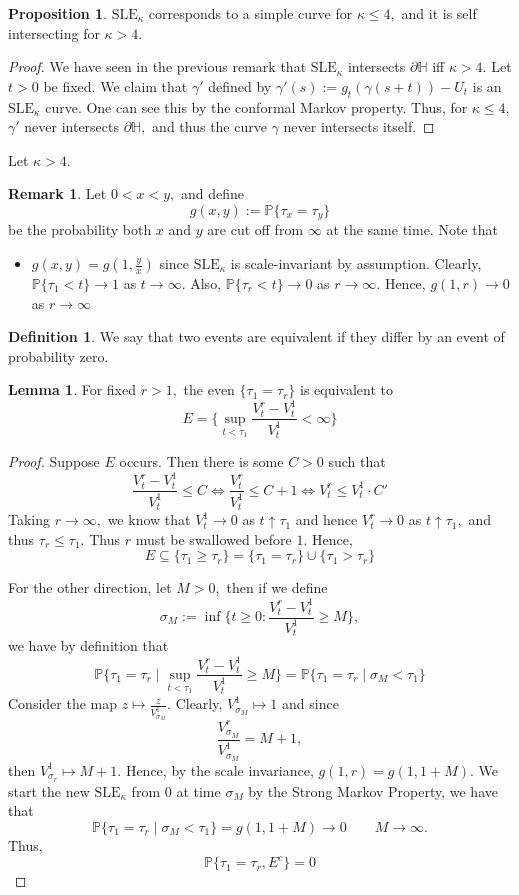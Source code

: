 \documentclass[10pt, oneside]{article}
\newcommand{\bbP}{\mathbb{P}}
\theoremstyle{definition}
\newtheorem{defn}{Definition}
\newtheorem{prop}{Proposition}
\newtheorem{rem}{Remark}
\newtheorem{lem}{Lemma}
\newcommand{\bbH}{\mathbb{H}}
\newcommand{\bbP}{\mathbb{P}}
\newcommand{\SLE}{\text{SLE}}
\begin{document}
\begin{prop}
    $\SLE_\kappa$ corresponds to a simple curve for $\kappa \leq 4,$ and it is self intersecting for $\kappa >4.$ 
\end{prop}
\begin{proof}
    We have seen in the previous remark that $\SLE_\kappa$  intersects $\partial \bbH$ iff $\kappa>4.$ Let $t>0$ be fixed. We claim that $\gamma'$ defined by $\gamma'(s):= g_t(\gamma(s + t)) - U_t$ is an $\SLE_\kappa$ curve. One can see this by the conformal Markov property. Thus, for $\kappa \leq 4,$ $\gamma'$ never intersects $\partial \bbH,$ and thus the curve $\gamma$ never intersects itself.
\end{proof}

Let $\kappa >4.$
\begin{rem}
    Let $0 < x < y,$ and define 
    \[g(x,y):= \bbP\{\tau_x = \tau_y\}\] be the probability both $x$ and $y$ are cut off from $\infty$ at the same time. Note that 
    \begin{itemize}
        \item $g(x,y) = g(1, \frac{y}{x})$ since $\SLE_\kappa$ is scale-invariant by assumption. Clearly, $\bbP\{\tau_1 < t\} \to 1$ as $t \to \infty. $ Also, $\bbP\{\tau_r < t\} \to 0$ as $r\to \infty.$ Hence, $g(1,r) \to 0$ as $r\to \infty$
    \end{itemize}
\end{rem}
\begin{defn}
    We say that two events are equivalent if they differ by an event of probability zero.
\end{defn}

\begin{lem}
    For fixed $r>1,$ the even $\{\tau_1 = \tau_r\}$ is equivalent to 
    \[E = \{\sup_{t< \tau_1} \frac{V_t^r - V_t^1}{V_t^1} < \infty\}\]
\end{lem}
\begin{proof}
    Suppose $E$ occurs. Then there is some $C>0$ such that 
    \[\frac{V_t^r- V_t^1}{V_t^1} \leq C \iff \frac{V_t^r}{V_t^1} \leq C + 1  \iff V_t^r \leq V_t^1 \cdot C'\] Taking $r\to \infty,$ we know that $V_t^1 \to 0$ as $t\uparrow \tau_1$ and hence $V_t^r \to 0$ as $t \uparrow \tau_1,$ and thus $\tau_r \leq \tau_1.$ Thus $r$ must be swallowed before $1.$ Hence, 
    \[E \subseteq \{\tau_1 \geq \tau_r\} = \{\tau_1 = \tau_r\}\cup \{\tau_1 > \tau _r\}\]

    For the other direction, let $M>0,$ then if we define 
    \[\sigma_M:= \inf\{t \geq 0 : \frac{V_t^r - V_t^1}{V_t^1} \geq M\},\] we have by definition that
    \[\bbP\{\tau_1 = \tau_r \mid \sup_{t <  \tau_1}\frac{V_t^r - V_t^1}{V_t^1}\geq M\}= \bbP\{\tau_1 = \tau_r \mid \sigma_M < \tau_1\}\] Consider the map $z \mapsto \frac{z}{V^1_{\sigma_M}}$. Clearly, $V_{\sigma_M}^1 \mapsto 1$ and since 
    \[\frac{V^r_{\sigma_M}}{V_{\sigma_M}^1} = M +1,\] then $V^1_{\sigma_r}\mapsto M+1.$ Hence, by the scale invariance, $g(1, r) = g(1, 1 + M).$ We start the new $\SLE_\kappa$ from $0$ at time $\sigma_M$ by the Strong Markov Property, we have that 
    \[\bbP\{\tau_1 = \tau_r \mid \sigma_M < \tau_1\} = g(1, 1 + M) \to 0 \qquad M \to \infty.\] Thus, 
    \[\bbP\{\tau_1 = \tau_r , E^c\} = 0\]
\end{proof}
\end{document}
